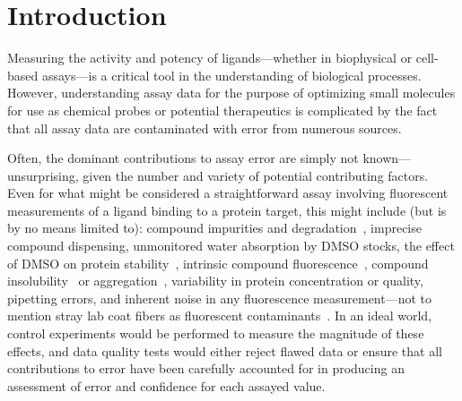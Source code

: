 \documentclass[aps,pre,twocolumn,nofootinbib,superscriptaddress,linenumbers]{revtex4-1}
\begin{document}
\section{Introduction}
\label{section:introduction}

Measuring the activity and potency of ligands---whether in biophysical or cell-based assays---is a critical tool in the understanding of biological processes.
However, understanding assay data for the purpose of optimizing small molecules for use as chemical probes or potential therapeutics is complicated by the fact that all assay data are contaminated with error from numerous sources.

Often, the dominant contributions to assay error are simply not known---unsurprising, given the number and variety of potential contributing factors.
Even for what might be considered a straightforward assay involving fluorescent measurements of a ligand binding to a protein target, this might include (but is by no means limited to): compound impurities and degradation~\cite{kozikowski_effect_2003,kozikowski_effect_2003-1,cheng_studies_2003,waybright_overcoming_2009}, imprecise compound dispensing, unmonitored water absorption by DMSO stocks, the effect of DMSO on protein stability~\cite{tjernberg_dmso-related_2005}, intrinsic compound fluorescence~\cite{simeonov_fluorescence_2008,baell_new_2010}, compound insolubility~\cite{di_biological_2006} or aggregation~\cite{mcgovern_common_2002,mcgovern_kinase_2003,feng_high-throughput_2005,feng_synergy_2006,baell_new_2010}, variability in protein concentration or quality, pipetting errors, and inherent noise in any fluorescence measurement---not to mention stray lab coat fibers as fluorescent contaminants~\cite{busch_does_2015}. 
In an ideal world, control experiments would be performed to measure the magnitude of these effects, and data quality tests would either reject flawed data or ensure that all contributions to error have been carefully accounted for in producing an assessment of error and confidence for each assayed value.

\end{document}
